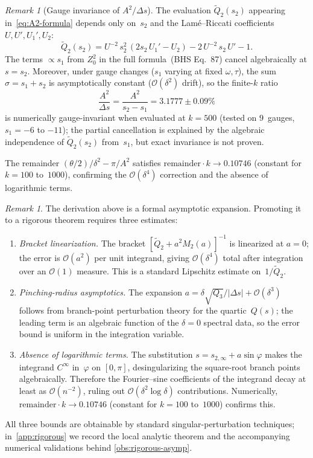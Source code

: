 \documentclass[11pt,a4paper]{article}
\theoremstyle{plain}
\theoremstyle{definition}
\theoremstyle{remark}
\newtheorem{remark}[theorem]{Remark}
\newcommand{\Oo}{\mathcal{O}}
\begin{document}
\begin{remark}[Gauge invariance of $A^2/\Delta s$]\label{rem:gauge-invariant}
  The evaluation $\tilde Q_2(s_2)$ appearing in~\eqref{eq:A2-formula}
  depends only on~$s_2$ and the Lam\'e--Riccati coefficients
  $U, U', U_1', U_2$:
  \[
    \tilde Q_2(s_2) = U^{-2}\,s_2^2\,(2s_2\,U_1' - U_2)
      - 2\,U^{-2}\,s_2\,U' - 1.
  \]
  The terms $\propto s_1$ from $Z_0^2$ in the full
  formula~\textup{(BHS Eq.~87)} cancel algebraically at $s = s_2$.
  Moreover, under gauge changes ($s_1$ varying at fixed $\omega, \tau$),
  the sum $\sigma = s_1 + s_2$ is asymptotically constant ($\Oo(\delta^2)$
  drift), so the finite-$k$ ratio
  \[
    \frac{A^2}{\Delta s} = \frac{A^2}{s_2 - s_1}
    = 3.1777 \pm 0.09\%
  \]
  is numerically gauge-invariant when evaluated at $k = 500$
  (tested on $9$~gauges, $s_1 = -6$ to $-11$);
  the partial cancellation is explained by
  the algebraic independence of $\tilde Q_2(s_2)$
  from~$s_1$, but exact invariance is not proven.
\end{remark}

The remainder $(\theta/2)/\delta^2 - \pi/A^2$ satisfies
$\mathrm{remainder}\cdot k \to 0.10746$ (constant for $k = 100$
to~$1000$), confirming the $\Oo(\delta^4)$ correction and the absence
of logarithmic terms.

\begin{remark}\label{rem:rigour-path}
  The derivation above is a formal asymptotic expansion.  Promoting
  it to a rigorous theorem requires three estimates:
  \begin{enumerate}[nosep,label=(\alph*)]
  \item \emph{Bracket linearization.}  The bracket
    $[\tilde Q_2 + a^2 M_2(a)]^{-1}$ is linearized at $a=0$;
    the error is $\Oo(a^2)$ per unit integrand, giving $\Oo(\delta^4)$
    total after integration over an $\Oo(1)$ measure.  This is a
    standard Lipschitz estimate on~$1/\tilde Q_2$.
  \item \emph{Pinching-radius asymptotics.}  The expansion
    $a = \delta\sqrt{Q_3}/|\Delta s| + \Oo(\delta^3)$ follows from
    branch-point perturbation theory for the quartic~$Q(s)$; the
    leading term is an algebraic function of the $\delta=0$ spectral
    data, so the error bound is uniform in the integration variable.
  \item \emph{Absence of logarithmic terms.}  The substitution
    $s = s_{2,\infty} + a\sin\varphi$ makes the integrand $C^\infty$
    in~$\varphi$ on $[0,\pi]$, desingularizing the square-root
    branch points algebraically.  Therefore
    the Fourier--sine coefficients of the integrand decay at least as
    $\Oo(n^{-2})$, ruling out $\Oo(\delta^2\log\delta)$ contributions.
    Numerically, $\mathrm{remainder}\cdot k \to 0.10746$ (constant
    for $k = 100$ to~$1000$) confirms this.
  \end{enumerate}
  All three bounds are obtainable by standard singular-perturbation
  techniques; in~\cref{app:rigorous} we record the local analytic
  theorem and the accompanying numerical validations behind
  \cref{obs:rigorous-asymp}.
\end{remark}
\end{document}
